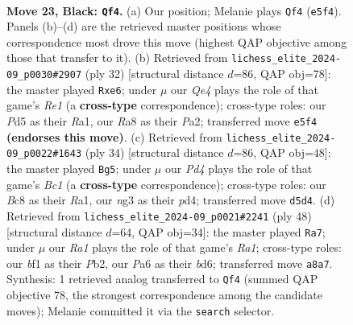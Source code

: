 \documentclass[11pt]{article}
\begin{document}
\clearpage

\begin{figure}[p]\centering
\begin{subfigure}{0.46\textwidth}\centering
\resizebox{\linewidth}{!}{%
\newchessgame
\chessboard[
  setfen={r1b2kr1/1p2bp1p/p5p1/2Bpq3/8/3K1PN1/PP4PP/1R1Q1B1R b - - 0 23},
  showmover=false,
  pgfstyle=straightmove, color=movearrow, markmove={e5-f4}
]}
\caption{}
\end{subfigure}\hfill
\begin{subfigure}{0.46\textwidth}\centering
\resizebox{\linewidth}{!}{%
\newchessgame
\chessboard[
  setfen={r2q1rk1/pp2bp2/4b1pp/3n4/7B/2PQ4/PPB2PPP/R3R1K1 w - - 0 17},
  showmover=false,
  pgfstyle=straightmove, color=movearrow, markmove={e1-e6}
]}
\caption{}
\end{subfigure}
\\[4pt]
\begin{subfigure}{0.46\textwidth}\centering
\resizebox{\linewidth}{!}{%
\newchessgame
\chessboard[
  setfen={r2q1b1r/p4kpp/8/3bpp2/Q2p4/6P1/PP3PBP/R1BR2K1 w - - 0 18},
  showmover=false,
  pgfstyle=straightmove, color=movearrow, markmove={c1-g5}
]}
\caption{}
\end{subfigure}\hfill
\begin{subfigure}{0.46\textwidth}\centering
\resizebox{\linewidth}{!}{%
\newchessgame
\chessboard[
  setfen={3rr1k1/2q2pp1/3b1n1p/1p6/2p5/2P1BQP1/1PB2P1P/R3R1K1 w - - 2 25},
  showmover=false,
  pgfstyle=straightmove, color=movearrow, markmove={a1-a7}
]}
\caption{}
\end{subfigure}
\caption{\textbf{Move 23, Black: \texttt{Qf4}.} (a) Our position; Melanie plays \texttt{Qf4} (\texttt{e5f4}). Panels (b)--(d) are the retrieved master positions whose correspondence most drove this move (highest QAP objective among those that transfer to it). (b) Retrieved from \texttt{lichess\_elite\_2024-09\_p0030\#2907} (ply 32) [structural distance $d$=86, QAP obj=78]: the master played \texttt{Rxe6}; under $\mu$ our \emph{Qe4} plays the role of that game's \emph{Re1} (a \textbf{cross-type} correspondence); cross-type roles: our \emph{P}d5 as their \emph{R}a1, our \emph{R}a8 as their \emph{P}a2; transferred move \texttt{e5f4} \textbf{(endorses this move)}. (c) Retrieved from \texttt{lichess\_elite\_2024-09\_p0022\#1643} (ply 34) [structural distance $d$=86, QAP obj=48]: the master played \texttt{Bg5}; under $\mu$ our \emph{Pd4} plays the role of that game's \emph{Bc1} (a \textbf{cross-type} correspondence); cross-type roles: our \emph{B}c8 as their \emph{R}a1, our \emph{n}g3 as their \emph{p}d4; transferred move \texttt{d5d4}. (d) Retrieved from \texttt{lichess\_elite\_2024-09\_p0021\#2241} (ply 48) [structural distance $d$=64, QAP obj=34]: the master played \texttt{Ra7}; under $\mu$ our \emph{Ra1} plays the role of that game's \emph{Ra1}; cross-type roles: our \emph{b}f1 as their \emph{P}b2, our \emph{P}a6 as their \emph{b}d6; transferred move \texttt{a8a7}. Synthesis: 1 retrieved analog transferred to \texttt{Qf4} (summed QAP objective 78, the strongest correspondence among the candidate moves); Melanie committed it via the \texttt{search} selector.}
\label{fig:thought-m45}
\end{figure}
\end{document}
